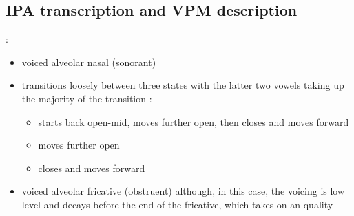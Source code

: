 \subsection{IPA transcription and VPM description}

:

\begin{itemize}
	\item {} voiced alveolar nasal (sonorant) 
	\item {} transitions loosely between three states with the latter two vowels taking up the majority of the transition : \begin{itemize}
		\item {} starts back open-mid, moves further open, then closes and moves forward
		\item {} moves further open
		\item {} closes and moves forward
	\end{itemize}
	\item {} voiced alveolar fricative (obstruent) although, in this case, the voicing is low level and decays before the end of the fricative, which takes on an  quality
\end{itemize}